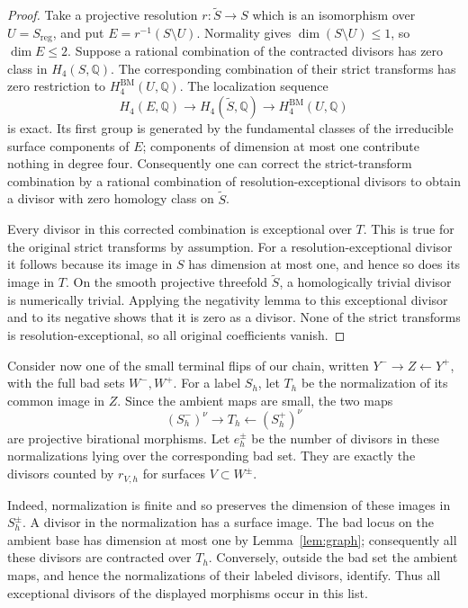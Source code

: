 \begin{proof}
Take a projective resolution \(r:\widetilde S\to S\) which is an
isomorphism over \(U=S_{\mathrm{reg}}\), and put
\(E=r^{-1}(S\setminus U)\).  Normality gives
\(\dim(S\setminus U)\leq1\), so \(\dim E\leq2\).
Suppose a rational combination of the contracted divisors has zero
class in \(H_4(S,\mathbb Q)\).  The corresponding combination of
their strict transforms has zero restriction to
\(H_4^{\mathrm{BM}}(U,\mathbb Q)\).  The localization sequence
\[
 H_4(E,\mathbb Q)\longrightarrow
 H_4(\widetilde S,\mathbb Q)\longrightarrow
 H_4^{\mathrm{BM}}(U,\mathbb Q)
\]
is exact.  Its first group is generated by the fundamental classes
of the irreducible surface components of \(E\); components of
dimension at most one contribute nothing in degree four.  Consequently
one can correct the strict-transform combination by a rational
combination of resolution-exceptional divisors to obtain a divisor
with zero homology class on \(\widetilde S\).

Every divisor in this corrected combination is exceptional over
\(T\).  This is true for the original strict transforms by
assumption.  For a resolution-exceptional divisor it follows because
its image in \(S\) has dimension at most one, and hence so does
its image in \(T\).  On the smooth projective threefold
\(\widetilde S\), a homologically trivial divisor is numerically
trivial.  Applying the negativity lemma to this exceptional divisor
and to its negative shows that it is zero as a divisor.  None of
the strict transforms is resolution-exceptional, so all original
coefficients vanish.
\end{proof}

Consider now one of the small terminal flips of our chain, written
\(Y^-\to Z\leftarrow Y^+\), with the full bad sets
\(W^-,W^+\).  For a label \(S_h\), let \(T_h\) be the
normalization of its common image in \(Z\).  Since the ambient maps
are small, the two maps
\[
 (S_h^-)^\nu\longrightarrow T_h
 \longleftarrow(S_h^+)^\nu
\]
are projective birational morphisms.  Let \(e_h^\pm\) be the number
of divisors in these normalizations lying over the corresponding
bad set.  They are exactly the divisors counted by
\(r_{V,h}\) for surfaces \(V\subset W^\pm\).

Indeed, normalization is finite and so preserves the dimension of
these images in \(S_h^\pm\).  A divisor in the normalization has
a surface image.  The bad locus on the ambient base has dimension
at most one by Lemma~\ref{lem:graph}; consequently all these divisors
are contracted over \(T_h\).  Conversely, outside the bad set
the ambient maps, and hence the normalizations of their labeled
divisors, identify.  Thus all exceptional divisors of the displayed
morphisms occur in this list.

